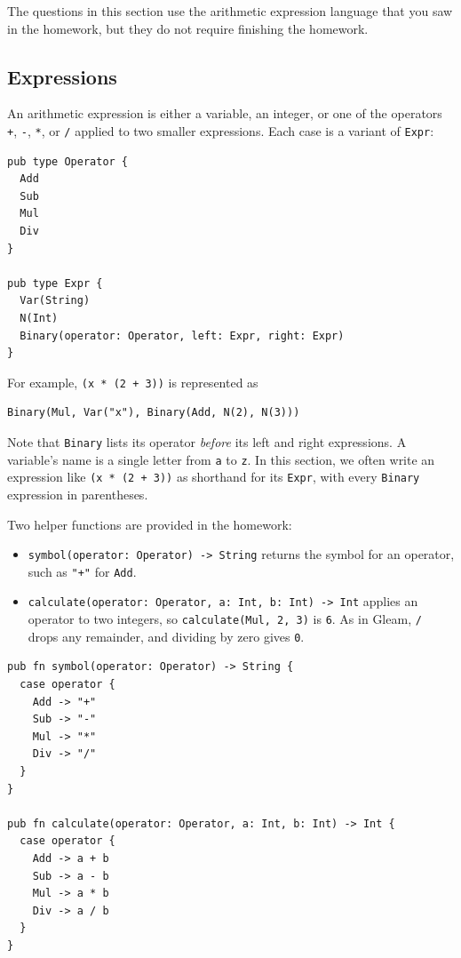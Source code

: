 The questions in this section use the arithmetic expression language that you saw in the homework, but they do not require finishing the homework.

\subsection*{Expressions}

An arithmetic expression is either a variable, an integer, or one of the operators \texttt{+}, \texttt{-}, \texttt{*}, or \texttt{/} applied to two smaller expressions. Each case is a variant of \lstinline{Expr}:
\begin{lstlisting}
pub type Operator {
  Add
  Sub
  Mul
  Div
}

pub type Expr {
  Var(String)
  N(Int)
  Binary(operator: Operator, left: Expr, right: Expr)
}
\end{lstlisting}
For example, \lstinline{(x * (2 + 3))} is represented as
\begin{lstlisting}
Binary(Mul, Var("x"), Binary(Add, N(2), N(3)))
\end{lstlisting}
Note that \lstinline{Binary} lists its operator \emph{before} its left and right expressions. A variable's name is a single letter from \texttt{a} to \texttt{z}. In this section, we often write an expression like \lstinline{(x * (2 + 3))} as shorthand for its \lstinline{Expr}, with every \lstinline{Binary} expression in parentheses.

Two helper functions are provided in the homework:
\begin{itemize}
  \item \lstinline{symbol(operator: Operator) -> String} returns the symbol for an operator, such as \lstinline{"+"} for \lstinline{Add}.
  \item \lstinline{calculate(operator: Operator, a: Int, b: Int) -> Int} applies an operator to two integers, so \lstinline{calculate(Mul, 2, 3)} is \texttt{6}. As in Gleam, \texttt{/} drops any remainder, and dividing by zero gives \texttt{0}.
\end{itemize}
\begin{lstlisting}
pub fn symbol(operator: Operator) -> String {
  case operator {
    Add -> "+"
    Sub -> "-"
    Mul -> "*"
    Div -> "/"
  }
}

pub fn calculate(operator: Operator, a: Int, b: Int) -> Int {
  case operator {
    Add -> a + b
    Sub -> a - b
    Mul -> a * b
    Div -> a / b
  }
}
\end{lstlisting}


